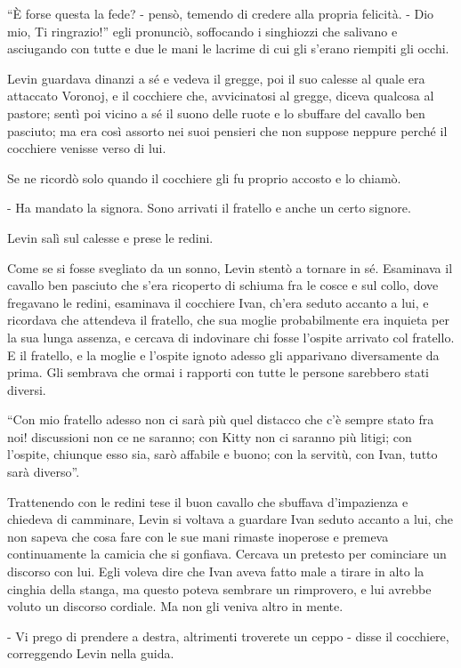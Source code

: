 ``È forse questa la fede? - pensò, temendo di credere alla propria felicità. - Dio mio, Ti ringrazio!'' egli pronunciò, soffocando i singhiozzi che salivano e asciugando con tutte e due le mani le lacrime di cui gli s'erano riempiti gli occhi. 

Levin guardava dinanzi a sé e vedeva il gregge, poi il suo calesse al quale era attaccato Voronoj, e il cocchiere che, avvicinatosi al gregge, diceva qualcosa al pastore; sentì poi vicino a sé il suono delle ruote e lo sbuffare del cavallo ben pasciuto; ma era così assorto nei suoi pensieri che non suppose neppure perché il cocchiere venisse verso di lui. 

Se ne ricordò solo quando il cocchiere gli fu proprio accosto e lo chiamò. 

- Ha mandato la signora. Sono arrivati il fratello e anche un certo signore. 

Levin salì sul calesse e prese le redini. 

Come se si fosse svegliato da un sonno, Levin stentò a tornare in sé. Esaminava il cavallo ben pasciuto che s'era ricoperto di schiuma fra le cosce e sul collo, dove fregavano le redini, esaminava il cocchiere Ivan, ch'era seduto accanto a lui, e ricordava che attendeva il fratello, che sua moglie probabilmente era inquieta per la sua lunga assenza, e cercava di indovinare chi fosse l'ospite arrivato col fratello. E il fratello, e la moglie e l'ospite ignoto adesso gli apparivano diversamente da prima. Gli sembrava che ormai i rapporti con tutte le persone sarebbero stati diversi. 

``Con mio fratello adesso non ci sarà più quel distacco che c'è sempre stato fra noi! discussioni non ce ne saranno; con Kitty non ci saranno più litigi; con l'ospite, chiunque esso sia, sarò affabile e buono; con la servitù, con Ivan, tutto sarà diverso''. 

Trattenendo con le redini tese il buon cavallo che sbuffava d'impazienza e chiedeva di camminare, Levin si voltava a guardare Ivan seduto accanto a lui, che non sapeva che cosa fare con le sue mani rimaste inoperose e premeva continuamente la camicia che si gonfiava. Cercava un pretesto per cominciare un discorso con lui. Egli voleva dire che Ivan aveva fatto male a tirare in alto la cinghia della stanga, ma questo poteva sembrare un rimprovero, e lui avrebbe voluto un discorso cordiale. Ma non gli veniva altro in mente. 

- Vi prego di prendere a destra, altrimenti troverete un ceppo - disse il cocchiere, correggendo Levin nella guida. 

